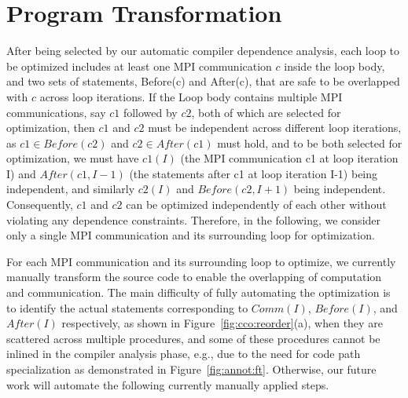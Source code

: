 \section{Program Transformation}
\label{sec-opt}

After being selected by our automatic compiler dependence analysis, each loop 
to be optimized includes at least one MPI communication $c$ inside the loop body, and two sets of statements, 
Before(c) and After(c), that are safe to be overlapped with $c$ across loop iterations. If the Loop body contains 
multiple MPI communications, say $c1$ followed by $c2$, both of which are selected for optimization, then $c1$ and $c2$
must be independent across different loop iterations, as $c1 \in Before(c2)$ and $c2 \in After(c1)$ must hold, and to be
both selected  for optimization, we must have $c1(I)$ (the MPI communication c1 at loop iteration I) and $After(c1,I-1)$ (the statements after c1 at loop iteration I-1) being independent, and  similarly $c2(I)$ and $Before(c2,I+1)$  being independent. 
Consequently, $c1$ and $c2$ can be optimized independently of each other without violating any dependence constraints. Therefore, in the following, we consider only a single MPI communication and its surrounding loop for optimization. 

For each MPI communication and its surrounding loop to optimize, we currently manually
transform the source code to enable the overlapping of
computation and communication. The main difficulty of fully automating the optimization is to identify the 
actual statements corresponding to $Comm(I)$, $Before(I)$, and $After(I)$ respectively, as shown in Figure~\ref{fig:cco:reorder}(a),
when they are scattered across multiple procedures,  and some of these procedures cannot be inlined in the compiler analysis phase, e.g., due to 
the need for code path specialization as demonstrated in Figure~\ref{fig:annot:ft}. 
Otherwise, our future work will automate the following currently manually applied steps. 


